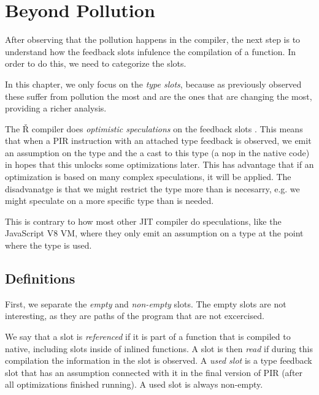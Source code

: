 \chapter{Beyond Pollution}


\begin{chapterabstract}
	\todoadd
\end{chapterabstract}

After observing that the pollution happens in the compiler, the next step is to understand how the feedback slots infulence the compilation of a function. In order to do this, we need to categorize the slots.


In this chapter, we only focus on the \textit{type slots}, because as previously observed these suffer from pollution the most and are the ones that are changing the most, providing a richer analysis.

The Ř compiler does \textit{optimistic speculations} on the feedback slots . This means that when a PIR instruction with an attached type feedback is observed, we emit an assumption on the type and the a cast to this type (a nop in the native code) in hopes that this unlocks some optimizations later. This has advantage that if an optimization is based on many complex speculations, it will be applied. The disadvanatge is that we might restrict the type more than is necesarry, e.g. we might speculate on a more specific type than is needed.

This is contrary to how most other JIT compiler do speculations, like the JavaScript V8 VM\todocite, where they only emit an assumption on a type at the point where the type is used.

\section{Definitions}

First, we separate the \textit{empty} and \textit{non-empty} slots. The empty slots are not interesting, as they are paths of the program that are not excercised.

We say that a slot is \textit{referenced} if it is part of a function that is compiled to native, including slots inside of inlined functions. A slot is then \textit{read} if during this compilation the information in the slot is observed. A \textit{used slot} is a type feedback slot that has an assumption connected with it in the final version of PIR (after all optimizations finished running). A used slot is always non-empty.

